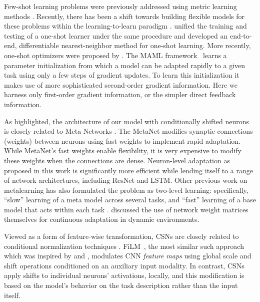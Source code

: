 \documentclass{article}
\begin{document}
Few-shot learning problems were previously addressed using metric learning methods \cite{koch2015siamese}. Recently, there has been a shift towards building flexible models for these problems within the learning-to-learn paradigm \cite{mishra2017meta,santoro2016meta}. \citet{vinyals2016matching} unified the training and testing of a one-shot learner under the same procedure and developed an end-to-end, differentiable nearest-neighbor method for one-shot learning. More recently, one-shot optimizers were proposed by \citet{Sachin2017,finn2017model}. The MAML framework~\citep{finn2017model} learns a parameter initialization from which a model can be adapted rapidly to a given task using only a few steps of gradient updates. To learn this initialization it makes use of more sophisticated second-order gradient information. Here we harness only first-order gradient information, or the simpler direct feedback information.

As highlighted, the architecture of our model with conditionally shifted neurons is closely related to Meta Networks \cite{pmlr-v70-munkhdalai17a}. The MetaNet modifies synaptic connections (weights) between neurons using fast weights \cite{schmidhuber1987,hinton1987using} to implement rapid adaptation. While MetaNet's fast weights enable flexibility, it is very expensive to modify these weights when the connections are dense. Neuron-level adaptation as proposed in this work is significantly more efficient while lending itself to a range of network architectures, including ResNet and LSTM. Other previous work on metalearning has also formulated the problem as two-level learning: specifically, ``slow'' learning of a meta model across several tasks, and ``fast'' learning of a base model that acts within each task \cite{schmidhuber1987,bengio1990learning,hochreiter2001learning,mitchell1993explanation,vilalta2002perspective,mishra2017meta}.
\citet{schmidhuber1993self} discussed the use of network weight matrices themselves for continuous adaptation in dynamic environments.

Viewed as a form of feature-wise transformation, CSNs are closely related to conditional normalization techniques \cite{lei2015predicting,dumoulin2016learned,ghiasi2017exploring,de2017modulating,perez2017film}. FiLM~\cite{perez2017film}, the most similar such approach which was inspired by \citet{dumoulin2016learned} and \citet{ghiasi2017exploring}, modulates CNN \emph{feature maps} using global scale and shift operations conditioned on an auxiliary input modality. In contrast, CSNs apply shifts to individual neurons' activations, locally, and this modification is based on the model's behavior on the task description rather than the input itself.
\end{document}

